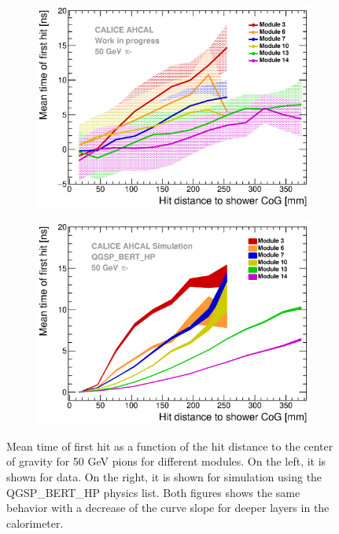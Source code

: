 \begin{figure}[htbp!]
	\begin{subfigure}[t]{0.49\textwidth}
		\centering
		\includegraphics[width=1\textwidth]{../Thesis_Plots/Timing/Pions/Plots/Timing_Radius_Comparison_ShortAsymRange_IndividualLayers.eps}
		\caption{}\label{fig:Radius_Indivi}
	\end{subfigure}
	\hfill
	\begin{subfigure}[t]{0.49\textwidth}
		\centering
		\includegraphics[width=1\textwidth]{../Thesis_Plots/Timing/Pions/Plots/Timing_Radius_Comparison_ShortAsymRange_IndividualLayers_Sim.eps}
		\caption{}\label{fig:Radius_Indivi_Sim}
	\end{subfigure}
	\caption{Mean time of first hit as a function of the hit distance to the center of gravity for 50 GeV pions for different modules. On the left, it is shown for data. On the right, it is shown for simulation using the QGSP\_BERT\_HP physics list. Both figures shows the same behavior with a decrease of the curve slope for deeper layers in the calorimeter.}
	\label{fig:Radius_IndiviAll}
\end{figure}

